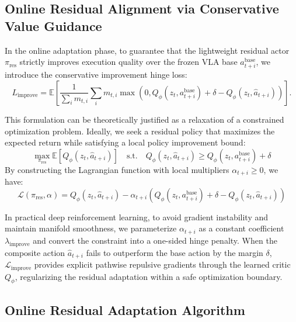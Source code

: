 \documentclass{article}
\begin{document}
\subsection{Online Residual Alignment via Conservative Value Guidance}
\label{sec:online_residual_alignment}

In the online adaptation phase, to guarantee that the lightweight residual actor $\pi_{\text{res}}$ strictly improves execution quality over the frozen VLA base $a^{\text{base}}_{t+i}$, we introduce the conservative improvement hinge loss:
\begin{equation}
L_{\text{improve}} = \mathbb{E} \left[ \frac{1}{\sum_i m_{t,i}} \sum_i m_{t,i} \max \left(0, Q_\phi(z_t, a_{t+i}^{\text{base}}) + \delta - Q_\phi(z_t, \hat{a}_{t+i})\right) \right].
\end{equation}

This formulation can be theoretically justified as a relaxation of a constrained optimization problem. Ideally, we seek a residual policy that maximizes the expected return while satisfying a local policy improvement bound:
\begin{equation}
\max_{\pi_{\text{res}}} \mathbb{E} \left[ Q_\phi(z_t, \hat{a}_{t+i}) \right] \quad \text{s.t.} \quad Q_\phi(z_t, \hat{a}_{t+i}) \ge Q_\phi(z_t, a^{\text{base}}_{t+i}) + \delta
\end{equation}
By constructing the Lagrangian function with local multipliers $\alpha_{t+i} \ge 0$, we have:
\begin{equation}
\mathcal{L}(\pi_{\text{res}}, \alpha) = Q_\phi(z_t, \hat{a}_{t+i}) - \alpha_{t+i} \left( Q_\phi(z_t, a^{\text{base}}_{t+i}) + \delta - Q_\phi(z_t, \hat{a}_{t+i}) \right)
\end{equation}

In practical deep reinforcement learning, to avoid gradient instability and maintain manifold smoothness, we parameterize $\alpha_{t+i}$ as a constant coefficient $\lambda_{\text{improve}}$ and convert the constraint into a one-sided hinge penalty. When the composite action $\hat{a}_{t+i}$ fails to outperform the base action by the margin $\delta$, $\mathcal{L}_{\text{improve}}$ provides explicit pathwise repulsive gradients through the learned critic $Q_\phi$, regularizing the residual adaptation within a safe optimization boundary.

\newpage

\subsection{Online Residual Adaptation Algorithm}
\end{document}
